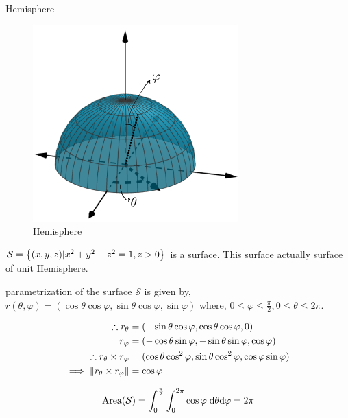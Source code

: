 \documentclass[Analysis-3]{subfiles}
\begin{document}
\begin{Eg}{Hemisphere}{}
    
    \begin{figure}
        \centering
        \includegraphics[width=.78\linewidth]{figures/lec-26.2.png}
        \caption{Hemisphere}
    \end{figure}

    $\mathcal{S} = \qty{(x,y,z) | x^2+y^2+z^2 = 1 , z >0 }$ is a surface. This surface actually surface of unit Hemisphere.
 
    parametrization of the surface $\mathcal{S}$ is given by, $r(\theta, \varphi) = (\cos \theta \cos \varphi, \sin \theta \cos \varphi , \sin \varphi)$ where, $0 \le \varphi \le \frac{\pi}{2} , 0 \le \theta \le 2\pi$.

    \begin{align*}
        \therefore r_{\theta} &= (-\sin \theta \cos \varphi, \cos \theta \cos \varphi, 0) \\
        r_{\varphi} &= (-\cos \theta \sin \varphi,-\sin \theta \sin \varphi , \cos \varphi) \\
        \therefore r_{\theta} \times r_{\varphi} &= (\cos \theta \cos ^2 \varphi, \sin \theta \cos ^2\varphi, \cos \varphi  \sin \varphi) \\
        \implies \norm{r_{\theta} \times r_{\varphi}} &= \cos \varphi 
    \end{align*}

    \[\text{Area}(\mathcal{S}) = \int_{0}^{\frac{\pi}{2}}\int_{0}^{2\pi} \cos \varphi \hspace{0.1cm} \dd \theta \dd \varphi = 2\pi \]

\end{Eg}
\end{document}
